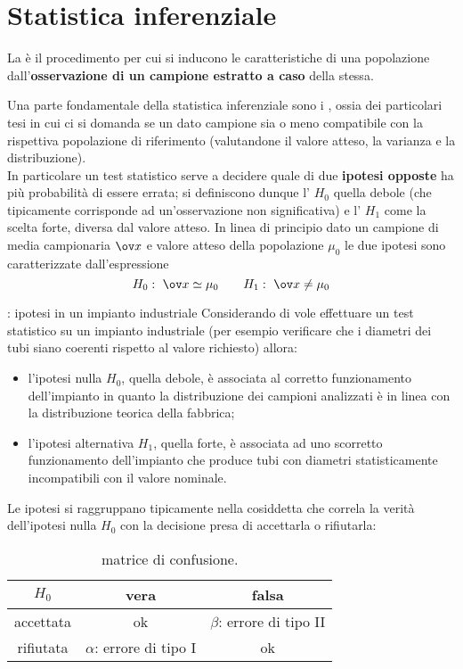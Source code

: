 \section{Statistica inferenziale}
	La  è il procedimento per cui si inducono le caratteristiche di una popolazione dall'\textbf{osservazione di un campione estratto a caso} della stessa. 
	
	Una parte fondamentale della statistica inferenziale sono i , ossia dei particolari tesi in cui ci si domanda se un dato campione sia o meno compatibile con la rispettiva popolazione di riferimento (valutandone il valore atteso, la varianza e la distribuzione). \\
	In particolare un test statistico serve a decidere quale di due \textbf{ipotesi opposte} ha più probabilità di essere errata; si definiscono dunque l' $H_0$ quella debole (che tipicamente corrisponde ad un'osservazione non significativa) e l' $H_1$ come la scelta forte, diversa dal valore atteso. In linea di principio dato un campione di media campionaria $\ov x$ e valore atteso della popolazione $\mu_0$ le due ipotesi sono caratterizzate dall'espressione
	\[ H_0:\ \ov x \simeq  \mu_0 \qquad H_1:\ \ov x \neq \mu_0 \]
	
	\begin{esempio}{: ipotesi in un impianto industriale} \label{es:stat:impianto}
		Considerando di vole effettuare un test statistico su un impianto industriale (per esempio verificare che i diametri dei tubi siano coerenti rispetto al valore richiesto) allora:
		\begin{itemize}
			\item l'ipotesi nulla $H_0$, quella debole, è associata al corretto funzionamento dell'impianto in quanto la distribuzione dei campioni analizzati è in linea con la distribuzione teorica della fabbrica;
			\item l'ipotesi alternativa $H_1$, quella forte, è associata ad uno scorretto funzionamento dell'impianto che produce tubi con diametri statisticamente incompatibili con il valore nominale.
		\end{itemize}
	\end{esempio}
	
	Le ipotesi si raggruppano tipicamente nella cosiddetta  che correla la verità dell'ipotesi nulla $H_0$ con la decisione presa di accettarla o rifiutarla:
	\begin{SCtable}[0.5][h!]
		
		\begin{tabular}{ c | c c}
			$H_0$ &  vera & falsa \\ \hline \hline 
			accettata & ok & {$\beta$: errore di tipo II  } \\
			rifiutata & $\alpha$: errore di tipo I  & ok
		\end{tabular}
		
		\caption{matrice di confusione.}
	\end{SCtable}
	
